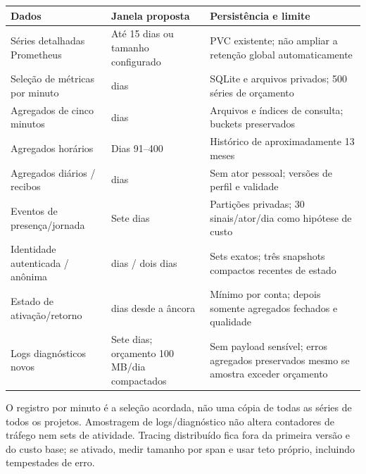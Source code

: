 \documentclass[10pt,a4paper]{article}
\begin{document}
{\def\LTcaptype{none} %
\small
{}
\begin{longtable}[]{@{}
  >{\raggedright\arraybackslash}p{}
  >{\raggedright\arraybackslash}p{}
  >{\raggedright\arraybackslash}p{}@{}}
\toprule\noalign{}
\rowcolor{NFAccent}
\begin{minipage}[b]{\linewidth}\raggedright
Dados
\end{minipage} & \begin{minipage}[b]{\linewidth}\raggedright
Janela proposta
\end{minipage} & \begin{minipage}[b]{\linewidth}\raggedright
Persistência e limite
\end{minipage} \\
\midrule\noalign{}
\endhead
\bottomrule\noalign{}
\endlastfoot
Séries detalhadas Prometheus & Até 15 dias ou tamanho configurado & PVC
existente; não ampliar a retenção global automaticamente \\
Seleção de métricas por minuto & 30 dias & SQLite e arquivos privados;
500 séries de orçamento \\
Agregados de cinco minutos & 90 dias & Arquivos e índices de consulta;
buckets preservados \\
Agregados horários & Dias 91--400 & Histórico de aproximadamente 13
meses \\
Agregados diários / recibos & 400 dias & Sem ator pessoal; versões de
perfil e validade \\
Eventos de presença/jornada & Sete dias & Partições privadas; 30
sinais/ator/dia como hipótese de custo \\
Identidade autenticada / anônima & 35 dias / dois dias & Sets exatos;
três snapshots compactos recentes de estado \\
Estado de ativação/retorno & 35 dias desde a âncora & Mínimo por conta;
depois somente agregados fechados e qualidade \\
Logs diagnósticos novos & Sete dias; orçamento 100 MB/dia compactados &
Sem payload sensível; erros agregados preservados mesmo se amostra
exceder orçamento \\
\end{longtable}
}

O registro por minuto é a seleção acordada, não uma cópia de todas as
séries de todos os projetos. Amostragem de logs/diagnóstico não altera
contadores de tráfego nem sets de atividade. Tracing distribuído fica
fora da primeira versão e do custo base; se ativado, medir tamanho por
span e usar teto próprio, incluindo tempestades de erro.
\end{document}
